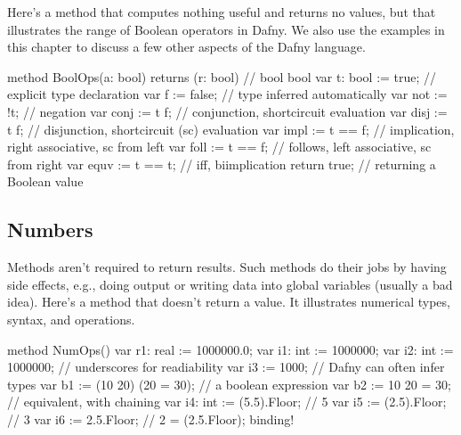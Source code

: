 \documentclass[letterpaper,10pt,english]{sphinxmanual}
\begin{document}
Here’s a method that computes nothing useful and returns no values,
but that illustrates the range of Boolean operators in Dafny. We also
use the examples in this chapter to discuss a few other aspects of the
Dafny language.

\begin{sphinxVerbatim}[commandchars=\\\{\}]
method BoolOps(a: bool) returns (r: bool)  // bool \PYGZhy{}\PYGZgt{} bool
\PYGZob{}
    var t: bool := true;    // explicit type declaration
    var f := false;         // type inferred automatically
    var not := !t;          // negation
    var conj := t \PYGZam{}\PYGZam{} f;     // conjunction, short\PYGZhy{}circuit evaluation
    var disj := t \textbar{}\textbar{} f;     // disjunction, short\PYGZhy{}circuit (sc) evaluation
    var impl := t ==\PYGZgt{} f;    // implication, right associative, sc from left
    var foll := t \PYGZlt{}== f;    // follows, left associative, sc from right
    var equv := t \PYGZlt{}==\PYGZgt{} t;   // iff, bi\PYGZhy{}implication
    return true;            // returning a Boolean value
 \PYGZcb{}
\end{sphinxVerbatim}


\subsection{Numbers}
\label{\detokenize{06-dafny-language:numbers}}
Methods aren’t required to return results. Such methods do their jobs
by having side effects, e.g., doing output or writing data into global
variables (usually a bad idea).  Here’s a method that doesn’t return a
value. It illustrates numerical types, syntax, and operations.

\begin{sphinxVerbatim}[commandchars=\\\{\}]
method NumOps()
\PYGZob{}
    var r1: real := 1000000.0;
    var i1: int := 1000000;
    var i2: int := 1\PYGZus{}000\PYGZus{}000;   // underscores for readiability
    var i3 := 1\PYGZus{}000;            // Dafny can often infer types
    var b1 := (10 \PYGZlt{} 20) \PYGZam{}\PYGZam{} (20 \PYGZlt{}= 30); // a boolean expression
    var b2 := 10 \PYGZlt{} 20 \PYGZlt{}= 30;    // equivalent, with \PYGZdq{}chaining\PYGZdq{}
    var i4: int := (5.5).Floor; // 5
    var i5 := (\PYGZhy{}2.5).Floor;     // \PYGZhy{}3
    var i6 := \PYGZhy{}2.5.Floor;        // \PYGZhy{}2 = \PYGZhy{}(2.5.Floor); binding!
\PYGZcb{}
\end{sphinxVerbatim}
\end{document}
